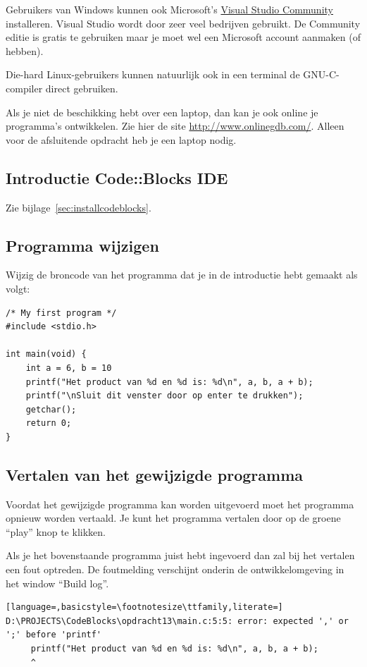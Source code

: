 \documentclass[a4paper,10pt,fleqn,twoside]{article}
\begin{document}
Gebruikers van Windows kunnen ook Microsoft’s \href{https://visualstudio.microsoft.com/vs/community/}{Visual Studio Community} installeren. Visual Studio wordt door zeer veel bedrijven gebruikt. De Community editie is gratis te gebruiken maar je moet wel een Microsoft account aanmaken (of hebben).

Die-hard Linux-gebruikers kunnen natuurlijk ook in een terminal de GNU-C-compiler direct gebruiken.

Als je niet de beschikking hebt over een laptop, dan kan je ook online je programma's ontwikkelen. Zie hier de site \url{http://www.onlinegdb.com/}. Alleen voor de afsluitende opdracht heb je een laptop nodig.

\subsection{Introductie Code::Blocks IDE}

Zie bijlage~\ref{sec:installcodeblocks}.

\subsection{Programma wijzigen}
Wijzig de broncode van het programma dat je in de introductie hebt gemaakt als volgt:

\begin{lstlisting}
/* My first program */
#include <stdio.h>

int main(void) {
    int a = 6, b = 10
    printf("Het product van %d en %d is: %d\n", a, b, a + b);
    printf("\nSluit dit venster door op enter te drukken");
    getchar();
    return 0;
}
\end{lstlisting}

\subsection{Vertalen van het gewijzigde programma
}Voordat het gewijzigde programma kan worden uitgevoerd moet het programma opnieuw worden vertaald. Je kunt het programma vertalen door op de groene ``play'' knop te klikken.

Als je het bovenstaande programma juist hebt ingevoerd dan zal bij het vertalen een fout optreden. De foutmelding verschijnt onderin de ontwikkelomgeving in het window ``Build log''. 

\begin{lstlisting}[language=,basicstyle=\footnotesize\ttfamily,literate=]
D:\PROJECTS\CodeBlocks\opdracht13\main.c:5:5: error: expected ',' or ';' before 'printf'
     printf("Het product van %d en %d is: %d\n", a, b, a + b);
     ^
\end{lstlisting}
\end{document}
